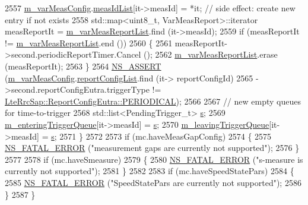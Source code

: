 \begin{DoxyCode}
2557       \hyperlink{classns3_1_1LteUeRrc_a27a7773eedfdab964d2514d9eeb1c562}{m\_varMeasConfig}.\hyperlink{structns3_1_1LteUeRrc_1_1VarMeasConfig_aa7ad91f943892cec48ffa9a5ae872e8c}{measIdList}[it->measId] = *it; \textcolor{comment}{// side effect: create new
       entry if not exists}
2558       std::map<uint8\_t, VarMeasReport>::iterator measReportIt = 
      \hyperlink{classns3_1_1LteUeRrc_a82da3c138c967761910c02b83724a0e4}{m\_varMeasReportList}.find (it->measId);
2559       \textcolor{keywordflow}{if} (measReportIt != \hyperlink{classns3_1_1LteUeRrc_a82da3c138c967761910c02b83724a0e4}{m\_varMeasReportList}.end ())
2560         \{
2561           measReportIt->second.periodicReportTimer.Cancel ();
2562           \hyperlink{classns3_1_1LteUeRrc_a82da3c138c967761910c02b83724a0e4}{m\_varMeasReportList}.erase (measReportIt);
2563         \}
2564       \hyperlink{assert_8h_a6dccdb0de9b252f60088ce281c49d052}{NS\_ASSERT} (\hyperlink{classns3_1_1LteUeRrc_a27a7773eedfdab964d2514d9eeb1c562}{m\_varMeasConfig}.\hyperlink{structns3_1_1LteUeRrc_1_1VarMeasConfig_a3ebdd65b8ad3393b5e869599e2a0afff}{reportConfigList}.find (it->
      reportConfigId)
2565                  ->second.reportConfigEutra.triggerType != 
      \hyperlink{structns3_1_1LteRrcSap_1_1ReportConfigEutra_a457763ab0765f15b66c62f8177fa412ea9b58d8f6c6d7ba8e59b08379fc3d92e7}{LteRrcSap::ReportConfigEutra::PERIODICAL});
2566 
2567       \textcolor{comment}{// new empty queues for time-to-trigger}
2568       std::list<PendingTrigger\_t> \hyperlink{generate__test__data__lte__sinr_8m_ad83eeb3a142285d1243a08c6b7026df8}{s};
2569       \hyperlink{classns3_1_1LteUeRrc_a06a26d8b08a9c635d7fa6ff8381fff4f}{m\_enteringTriggerQueue}[it->measId] = \hyperlink{generate__test__data__lte__sinr_8m_ad83eeb3a142285d1243a08c6b7026df8}{s};
2570       \hyperlink{classns3_1_1LteUeRrc_a7984d05cbcc51cd9239a22bd7e400d06}{m\_leavingTriggerQueue}[it->measId] = \hyperlink{generate__test__data__lte__sinr_8m_ad83eeb3a142285d1243a08c6b7026df8}{s};
2571     \}
2572 
2573   \textcolor{keywordflow}{if} (mc.haveMeasGapConfig)
2574     \{
2575       \hyperlink{group__fatal_ga5131d5e3f75d7d4cbfd706ac456fdc85}{NS\_FATAL\_ERROR} (\textcolor{stringliteral}{"measurement gaps are currently not supported"});
2576     \}
2577 
2578   \textcolor{keywordflow}{if} (mc.haveSmeasure)
2579     \{
2580       \hyperlink{group__fatal_ga5131d5e3f75d7d4cbfd706ac456fdc85}{NS\_FATAL\_ERROR} (\textcolor{stringliteral}{"s-measure is currently not supported"});
2581     \}
2582 
2583   \textcolor{keywordflow}{if} (mc.haveSpeedStatePars)
2584     \{
2585       \hyperlink{group__fatal_ga5131d5e3f75d7d4cbfd706ac456fdc85}{NS\_FATAL\_ERROR} (\textcolor{stringliteral}{"SpeedStatePars are currently not supported"});
2586     \}
2587 \}
\end{DoxyCode}


